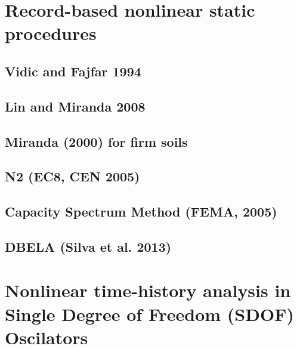 	\section{Record-based nonlinear static procedures}
	\label{sec:record-nsp}
	
	
		\subsection{Vidic and Fajfar 1994}
		\label{subsec:VidicEtAl1994}
		
		
		\subsection{Lin and Miranda 2008}
		\label{subsec:LinMiranda2008}
		
	
		\subsection{Miranda (2000) for firm soils}
		\label{subsec:Miranda}
		
		
		\subsection{N2 (EC8, CEN 2005)}
		\label{subsec:N2}
		
	
		\subsection{Capacity Spectrum Method (FEMA, 2005)}
		\label{subsec:CSM}
		
		
		\subsection{DBELA (Silva et al. 2013)}
		\label{subsec:DBELA_Silva2013}
		
		
	\section{Nonlinear time-history analysis in Single Degree of Freedom (SDOF) Oscilators}
	\label{subsec:NLTHA_SDOF}
	
		
